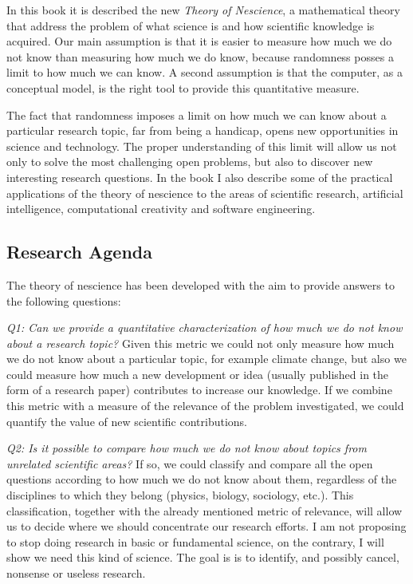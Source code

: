 In this book it is described the new \emph{Theory of Nescience}, a mathematical theory that address the problem of what science is and how scientific knowledge is acquired. Our main assumption is that it is easier to measure how much we do not know than measuring how much we do know, because randomness posses a limit to how much we can know. A second assumption is that the computer, as a conceptual model, is the right tool to provide this quantitative measure.

The fact that randomness imposes a limit on how much we can know about a particular research topic, far from being a handicap, opens new opportunities in science and technology. The proper understanding of this limit will allow us not only to solve the most challenging open problems, but also to discover new interesting research questions. In the book I also describe some of the practical applications of the theory of nescience to the areas of scientific research, artificial intelligence, computational creativity and software engineering.

%
%

\subsection*{Research Agenda}

The theory of nescience has been developed with the aim to provide answers to the following questions:

\emph{Q1: Can we provide a quantitative characterization of how much we do not know about a research topic?} Given this metric we could not only measure how much we do not know about a particular topic, for example climate change, but also we could measure how much a new development or idea (usually published in the form of a research paper) contributes to increase our knowledge. If we combine this metric with a measure of the relevance of the problem investigated, we could quantify the value of new scientific contributions.

\emph{Q2: Is it possible to compare how much we do not know about topics from unrelated scientific areas?} If so, we could classify and compare all the open questions according to how much we do not know about them, regardless of the disciplines to which they belong (physics, biology, sociology, etc.). This classification, together with the already mentioned metric of relevance, will allow us to decide where we should concentrate our research efforts. I am not proposing to stop doing research in basic or fundamental science, on the contrary, I will show we need this kind of science. The goal is is to identify, and possibly cancel, nonsense or useless research.

